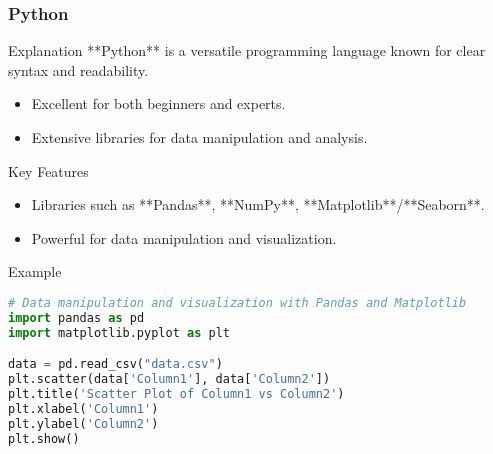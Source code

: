\documentclass[aspectratio=169]{beamer}
\begin{document}
\begin{frame}[fragile]
    \frametitle{Python}
    
    \begin{block}{Explanation}
        **Python** is a versatile programming language known for clear syntax and readability.
        \begin{itemize}
            \item Excellent for both beginners and experts.
            \item Extensive libraries for data manipulation and analysis.
        \end{itemize}
    \end{block}
    
    \begin{block}{Key Features}
        \begin{itemize}
            \item Libraries such as **Pandas**, **NumPy**, **Matplotlib**/**Seaborn**.
            \item Powerful for data manipulation and visualization.
        \end{itemize}
    \end{block}
    
    \begin{block}{Example}
        \begin{lstlisting}[language=Python]
# Data manipulation and visualization with Pandas and Matplotlib
import pandas as pd
import matplotlib.pyplot as plt

data = pd.read_csv("data.csv")
plt.scatter(data['Column1'], data['Column2'])
plt.title('Scatter Plot of Column1 vs Column2')
plt.xlabel('Column1')
plt.ylabel('Column2')
plt.show()
        \end{lstlisting}
    \end{block}
\end{frame}
\end{document}

